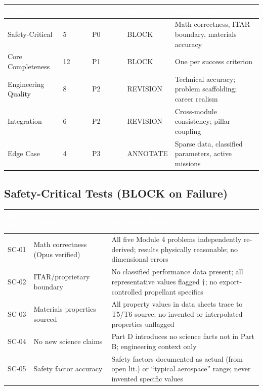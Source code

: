 \documentclass[11pt,letterpaper]{article}
\newcommand{\tableheader}[1]{\textbf{\sffamily\textcolor{white}{#1}}}
\begin{document}
\begin{center}
\begin{tabularx}{\textwidth}{L{3cm}C{1.5cm}C{1.5cm}L{2cm}X}
\toprule
{}
\tableheader{Category} & \tableheader{Count} & \tableheader{Priority} & \tableheader{On Fail} & \tableheader{Description} \\
\midrule
Safety-Critical & 5 & P0 & BLOCK & Math correctness, ITAR boundary, materials accuracy \\
Core Completeness & 12 & P1 & BLOCK & One per success criterion \\
Engineering Quality & 8 & P2 & REVISION & Technical accuracy; problem scaffolding; career realism \\
Integration & 6 & P2 & REVISION & Cross-module consistency; pillar coupling \\
Edge Case & 4 & P3 & ANNOTATE & Sparse data, classified parameters, active missions \\
\bottomrule
\end{tabularx}
\end{center}

\subsection{Safety-Critical Tests (BLOCK on Failure)}

\begin{center}
\begin{tabularx}{\textwidth}{L{1.5cm}L{3.5cm}X}
\toprule
{}
\tableheader{Test ID} & \tableheader{Verifies} & \tableheader{Expected Result} \\
\midrule
SC-01 & Math correctness (Opus verified) & All five Module 4 problems independently re-derived; results physically reasonable; no dimensional errors \\
SC-02 & ITAR/proprietary boundary & No classified performance data present; all representative values flagged $\dagger$; no export-controlled propellant specifics \\
SC-03 & Materials properties sourced & All property values in data sheets trace to T5/T6 source; no invented or interpolated properties unflagged \\
SC-04 & No new science claims & Part D introduces no science facts not in Part B; engineering context only \\
SC-05 & Safety factor accuracy & Safety factors documented as actual (from open lit.) or ``typical aerospace'' range; never invented specific values \\
\bottomrule
\end{tabularx}
\end{center}
\end{document}
